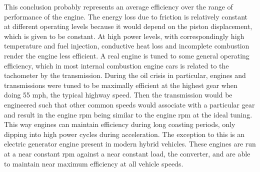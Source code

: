 \documentclass[a4paper, 12pt]{config/homework}
\begin{document}
\bigskip\noindent
This conclusion probably represents an average efficiency over the range of performance of the engine. The energy loss due to friction is relatively constant at different operating levels because it would depend on the piston displacement, which is given to be constant. At high power levels, with correspondingly high temperature and fuel injection, conductive heat loss and incomplete combustion render the engine less efficient. A real engine is tuned to some general operating efficiency, which in most internal combustion engine cars is related to the tachometer by the transmission. During the oil crisis in particular, engines and transmissions were tuned to be maximally efficient at the highest gear when doing 55 mph, the typical highway speed. Then the transmission would be engineered such that other common speeds would associate with a particular gear and result in the engine rpm being similar to the engine rpm at the ideal tuning. This way engines can maintain efficiency during long coasting periods, only dipping into high power cycles during acceleration. The exception to this is an electric generator engine present in modern hybrid vehicles. These engines are run at a near constant rpm against a near constant load, the converter, and are able to maintain near maximum efficiency at all vehicle speeds.
\end{document}
